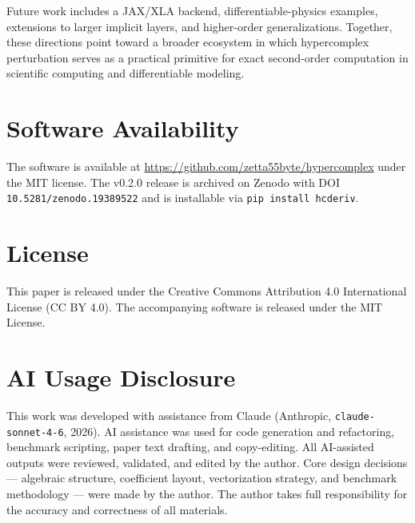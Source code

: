 \documentclass[11pt]{article}
\begin{document}
Future work includes a JAX/XLA backend, differentiable-physics examples, extensions
to larger implicit layers, and higher-order generalizations. Together, these directions
point toward a broader ecosystem in which hypercomplex perturbation serves as a
practical primitive for exact second-order computation in scientific computing and
differentiable modeling.

\section*{Software Availability}

The software is available at \url{https://github.com/zetta55byte/hypercomplex}
under the MIT license. The v0.2.0 release is archived on Zenodo
\citep{byte2026c} with DOI \texttt{10.5281/zenodo.19389522} and is
installable via \texttt{pip install hcderiv}.

\section*{License}

This paper is released under the Creative Commons Attribution 4.0 International
License (CC BY 4.0). The accompanying software is released under the MIT License.

\section*{AI Usage Disclosure}

This work was developed with assistance from Claude (Anthropic,
\texttt{claude-sonnet-4-6}, 2026). AI assistance was used for code generation
and refactoring, benchmark scripting, paper text drafting, and copy-editing.
All AI-assisted outputs were reviewed, validated, and edited by the author.
Core design decisions — algebraic structure, coefficient layout, vectorization
strategy, and benchmark methodology — were made by the author. The author takes
full responsibility for the accuracy and correctness of all materials.



\end{document}
